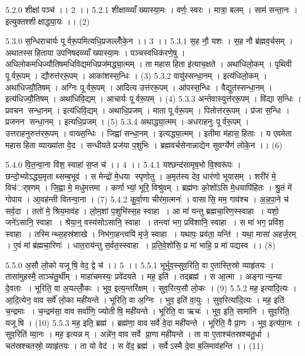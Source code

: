 5.2.0
शीक्षां पञ्च॑ ।। 2 ।।
5.2.1
शीक्षाव्व्याँख्यास्या॒मः । वर्णः॒ स्वरः । मात्रा॒ बलम् । साम॑ सन्ता॒नः । इत्युक्तश्शीक्षाद्ध्या॒यः ।। (2)
\anuvakamend

5.3.0
स॒न्धिराचार्यः पूर्वरू॒पमित्यधि॒प्रजल्लोँ॑के॒न ।। 3 ।।
5.3.1
स॒ह नौ॒ यशः । स॒ह नौ ब्र॑ह्मव॒र्चसम् । अथातस्सहिताया उपनिषदव्व्याँख्यास्या॒मः । पञ्चस्वधिक॑रणे॒षु । अधिलोकमधिज्यौतिषमधिविद्यमधिप्रज॑मद्ध्या॒त्मम् । ता महासहिता इ॑त्याच॒क्षते । अथा॑धिलो॒कम् । पृथिवी पूर्वरू॒पम् । द्यौरुत्त॑ररू॒पम् । आका॑शस्स॒न्धिः । (3)
5.3.2
वायु॑स्सन्धा॒नम् । इत्य॑धिलो॒कम् । अथा॑धिज्यौ॒तिषम् । अग्निः पूर्वरू॒पम् । आदित्य उत्त॑ररू॒पम् । आ॑पस्स॒न्धिः । वैद्युत॑स्सन्धा॒नम् । इत्य॑धिज्यौ॒तिषम् । अथा॑धिवि॒द्यम् । आचार्यः पूर्वरू॒पम् । (4)
5.3.3
अन्तेवास्युत्त॑ररू॒पम् । वि॑द्या स॒न्धिः । प्रवचन सन्धा॒नम् । इत्य॑धिवि॒द्यम् । अथाधि॒प्रजम् । माता पूर्वरू॒पम् । पितोत्त॑ररू॒पम् । प्र॑जा स॒न्धिः । प्रजनन सन्धा॒नम् । इत्यधि॒प्रजम् । (5)
5.3.4
अथाद्ध्या॒त्मम् । अधराहनुः पूर्वरू॒पम् । उत्तराहनुरुत्त॑ररू॒पम् । वाख्स॒न्धिः । जिह्वा॑ सन्धा॒नम् । इत्यद्ध्या॒त्मम् । इतीमा म॑हास॒हिताः । य एवमेता महासहिता व्याख्या॑ता वे॒द । सन्धीयते प्रज॑या प॒शुभिः । ब्रह्मवर्चसेनान्नाद्येन सुवर्ग्येण॑ लोके॒न ।। (6)
\anuvakamend

5.4.0
वि॒त॒न्वा॒ना वि॑श॒ स्वाहा॑ स॒प्त च॑ ।। 4 ।।
5.4.1
यश्छन्द॑सामृष॒भो वि॒श्वरू॑पः । छन्दो॒भ्योऽद्ध्य॒मृताथ्सम्ब॒भूव॑ । स मेन्द्रो॑ मे॒धया स्पृणोतु । अ॒मृत॑स्य देव॒ धार॑णो भूयासम् । शरी॑रं मे॒ विच॑र््षणम् । जि॒ह्वा मे॒ मधु॑मत्तमा । कर्णाभ्यां॒ भूरि॒ विश्रु॑वम् । ब्रह्म॑णः को॒शो॑ऽसि मे॒धयापि॑हितः । श्रु॒तं मे॑ गोपाय । आ॒वह॑न्ती वितन्वा॒ना । (7)
5.4.2
कु॒र्वा॒णा चीर॑मा॒त्मनः॑ । वासासि॒ मम॒ गाव॑श्च । अ॒न्न॒पा॒ने च॑ सर्व॒दा । ततो॑ मे॒ श्रिय॒माव॑ह । लो॒म॒शां प॒शुभि॑स्स॒ह स्वाहा । आ मा॑ यन्तु ब्रह्मचा॒रिण॒स्स्वाहा । यशो॒ जने॑ऽसानि॒ स्वाहा । श्रेया॒न्॒ वस्य॑सोऽसानि॒ स्वाहा । तन्त्वा॑ भग॒ प्रवि॑शानि॒ स्वाहा । स मा॑ भग॒ प्रवि॑श॒ स्वाहा । तस्मिन्थ्स॒हस्र॑शाखे । निभ॑गा॒हन्त्वयि॑ मृजे॒ स्वाहा । यथापः॒ प्रव॑ता॒ यन्ति॑ । यथा॒ मासा॑ अहर्ज॒रम् । ए॒वं मां ब्र॑ह्मचा॒रिणः॑ । धात॒राय॑न्तु स॒र्वत॒स्स्वाहा । प्र॒ति॒वे॒शो॑सि॒ प्र मा॑ भाहि॒ प्र मा॑ पद्यस्व ।। (8)
\anuvakamend

5.5.0
अ॒सौ लो॒को यजूषि॒ वेद॒ द्वे च॑ ।। 5 ।।
5.5.1
भूर्भुव॒स्सुव॒रिति॒ वा ए॒तास्ति॒स्रो व्याहृ॑तयः । तासा॑मुहस्मै॒ ताञ्च॑तु॒र्थीम् । माहा॑चमस्यः॒ प्रवे॑दयते । मह॒ इति॑ । तद्ब्रह्म॑ । स आ॒त्मा । अङ्गान्य॒न्या दे॒वताः । भूरिति॒ वा अ॒यल्लोँ॒कः । भुव॒ इत्य॒न्तरि॑क्षम् । सुव॒रित्य॒सौ लो॒कः । (9)
5.5.2
मह॒ इत्या॑दि॒त्यः । आ॒दि॒त्येन॒ वाव सर्वे॑ लो॒का मही॑यन्ते । भूरिति॒ वा अ॒ग्निः । भुव॒ इति॑ वा॒युः । सुव॒रित्या॑दि॒त्यः । मह॒ इति॑ च॒न्द्रमाः । च॒न्द्रम॑सा॒ वाव सर्वा॑णि॒ ज्योतीषि॒ मही॑यन्ते । भूरिति॒ वा ऋचः॑ । भुव॒ इति॒ सामा॑नि । सुव॒रिति॒ यजूषि । (10)
5.5.3
मह॒ इति॒ ब्रह्म॑ । ब्रह्म॑णा॒ वाव सर्वे॑ वे॒दा मही॑यन्ते । भूरिति॒ वै प्रा॒णः । भुव॒ इत्य॑पा॒नः । सुव॒रिति॑ व्या॒नः । मह॒ इत्यन्नम् । अन्ने॑न॒ वाव सर्वे प्रा॒णा मही॑यन्ते । ता वा ए॒ताश्च॑तस्रश्चतु॒र्धा । चत॑स्रश्चतस्रो॒ व्याहृ॑तयः । ता यो वेद॑ । स वे॑द॒ ब्रह्म॑ । सर्वेऽस्मै दे॒वा ब॒लिमाव॑हन्ति ।। (11)
\anuvakamend

